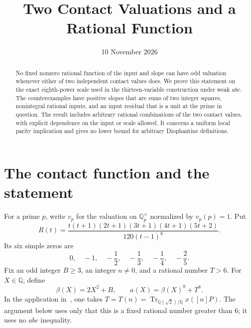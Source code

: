 \documentclass[11pt,a4paper]{article}
\title{Two Contact Valuations and a Rational Function}
\author{}\date{10 November 2026}
\theoremstyle{remark}\newtheorem{remark}[theorem]{Remark}
\newcommand{\Q}{\mathbb Q}\newcommand{\Z}{\mathbb Z}
\DeclareMathOperator{\Tr}{Tr}
\begin{document}
\maketitle
\begin{abstract}
No fixed nonzero rational function of the input and slope can
have odd valuation whenever either of two independent contact
values does. We prove this statement on the exact eighth-power
scale used in the thirteen-variable construction under weak
\(abc\). The counterexamples have positive slopes that are sums
of two integer squares, nonintegral rational inputs, and an input
residual that is a unit at the prime in question. The result
includes arbitrary rational combinations of the two contact
values, with explicit dependence on the input or scale allowed.
It concerns a uniform local parity implication and gives no lower
bound for arbitrary Diophantine definitions.
\end{abstract}

\section{The contact function and the statement}

For a prime \(p\), write \(v_p\) for the valuation on
\(\Q_p^\times\) normalized by \(v_p(p)=1\). Put
\begin{equation}\label{eq:R}
 R(t)=
 \frac{t(t+1)(2t+1)(3t+1)(4t+1)(5t+2)}
      {120(t-1)^8}.
\end{equation}
Its six simple zeros are
\[
 0,\quad -1,\quad-\frac12,\quad-\frac13,\quad-\frac14,
 \quad-\frac25.
\]
Fix an odd integer \(B\ge3\), an integer \(n\ne0\), and a rational
number \(T>6\). For \(X\in\Q\), define
\begin{equation}\label{eq:scale}
       \beta(X)=2X^2+B,\qquad a(X)=\beta(X)^8+T^8.
\end{equation}
In the application in~\cite{Conditional13}, one takes
\(T=T(n)=\Tr_{\Q(\sqrt2)/\Q}x([n]P)\).
The argument below uses only that this is a fixed rational number
greater than \(6\); it uses no \(abc\) inequality.
\end{document}
